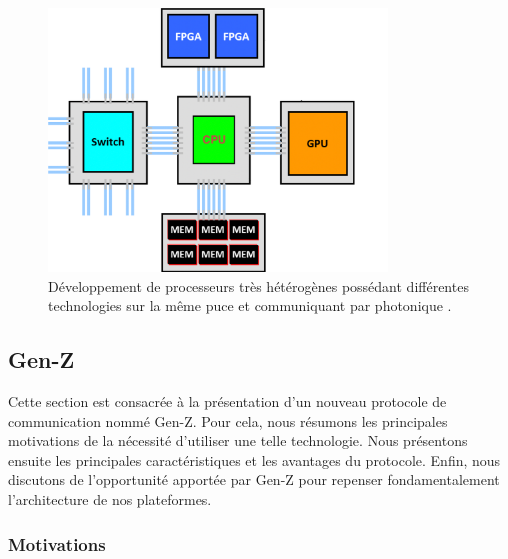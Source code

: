           \begin{figure}
        \center
        \includegraphics[width=9cm]{images/edl_hetero_chip.png}
        \caption{\label{fig:edl_hetero_chip}Développement de processeurs très hétérogènes possédant différentes technologies sur la même puce et communiquant par photonique \cite{Bergman2018}.}
        \end{figure}
            
      

      


\subsection{Gen-Z}\label{sec:gen_z}
    
    Cette section est consacrée à la présentation d'un nouveau protocole de communication nommé Gen-Z. Pour cela, nous résumons les principales motivations de la nécessité d'utiliser une telle technologie. Nous présentons ensuite les principales caractéristiques et les avantages du protocole. Enfin, nous discutons de l'opportunité apportée par Gen-Z pour repenser fondamentalement l'architecture de nos plateformes.
        
    \subsubsection{Motivations}

